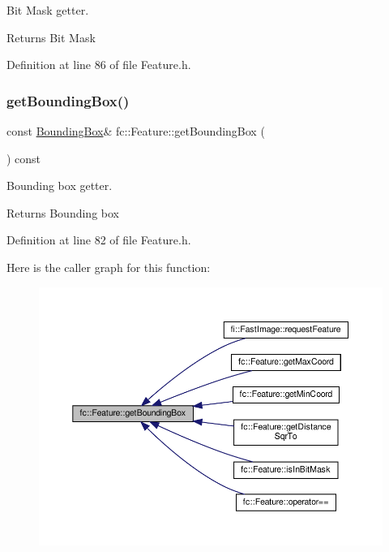 Bit Mask getter. 

\begin{DoxyReturn}{Returns}
Bit Mask 
\end{DoxyReturn}


Definition at line 86 of file Feature.\+h.

\mbox{\label{classfc_1_1Feature_ac5793261f78e3cd9ec934b1f70ef4725}} 
\subsubsection{\texorpdfstring{get\+Bounding\+Box()}{getBoundingBox()}}
{\footnotesize\ttfamily const \hyperlink{classfc_1_1BoundingBox}{Bounding\+Box}\& fc\+::\+Feature\+::get\+Bounding\+Box (\begin{DoxyParamCaption}{ }\end{DoxyParamCaption}) const\hspace{0.3cm}{\ttfamily [inline]}}



Bounding box getter. 

\begin{DoxyReturn}{Returns}
Bounding box 
\end{DoxyReturn}


Definition at line 82 of file Feature.\+h.

Here is the caller graph for this function\+:
\nopagebreak
\begin{figure}[H]
\begin{center}
\leavevmode
\includegraphics[width=350pt]{d7/d71/classfc_1_1Feature_ac5793261f78e3cd9ec934b1f70ef4725_icgraph}
\end{center}
\end{figure}
\mbox{\label{classfc_1_1Feature_a21626e0da332bd17ef8b50b137c6e696}} 
